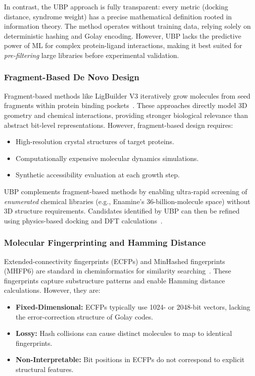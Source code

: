 \documentclass[12pt,a4paper]{article}
\begin{document}
In contrast, the UBP approach is fully transparent: every metric (docking distance, syndrome weight) has a precise mathematical definition rooted in information theory. The method operates without training data, relying solely on deterministic hashing and Golay encoding. However, UBP lacks the predictive power of ML for complex protein-ligand interactions, making it best suited for \textit{pre-filtering} large libraries before experimental validation.

\subsubsection{Fragment-Based De Novo Design}

Fragment-based methods like LigBuilder V3 iteratively grow molecules from seed fragments within protein binding pockets~\cite{LigBuilderV3}. These approaches directly model 3D geometry and chemical interactions, providing stronger biological relevance than abstract bit-level representations. However, fragment-based design requires:

\begin{itemize}
\item High-resolution crystal structures of target proteins.
\item Computationally expensive molecular dynamics simulations.
\item Synthetic accessibility evaluation at each growth step.
\end{itemize}

UBP complements fragment-based methods by enabling ultra-rapid screening of \textit{enumerated} chemical libraries (e.g., Enamine's 36-billion-molecule space) without 3D structure requirements. Candidates identified by UBP can then be refined using physics-based docking and DFT calculations~\cite{Bui2021DFT,Parida2025CDFT}.

\subsubsection{Molecular Fingerprinting and Hamming Distance}

Extended-connectivity fingerprints (ECFPs) and MinHashed fingerprints (MHFP6) are standard in cheminformatics for similarity searching~\cite{Leist2020Fingerprints}. These fingerprints capture substructure patterns and enable Hamming distance calculations. However, they are:

\begin{itemize}
\item \textbf{Fixed-Dimensional:} ECFPs typically use 1024- or 2048-bit vectors, lacking the error-correction structure of Golay codes.
\item \textbf{Lossy:} Hash collisions can cause distinct molecules to map to identical fingerprints.
\item \textbf{Non-Interpretable:} Bit positions in ECFPs do not correspond to explicit structural features.
\end{itemize}
\end{document}
